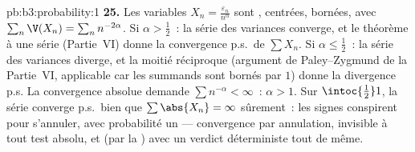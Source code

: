 \begin{solution}{pb:b3:probability:1}
\textbf{25.} Les variables $X_n = \frac{\varepsilon_n}
{n^\alpha}$ sont , centrées, bornées, avec
$\sum_n\V(X_n) = \sum_nn^{-2\alpha}$. Si $\alpha >
\frac12$~: la série des variances converge, et le théorème
à une série (Partie~VI) donne la convergence p.s.\ de
$\sum X_n$. Si $\alpha \leq \frac12$~: la série des
variances diverge, et la moitié réciproque (argument de
Paley--Zygmund de la Partie~VI, applicable car les summands
sont bornés par $1$) donne la divergence p.s. La
convergence absolue demande $\sum n^{-\alpha} < \infty$~:
$\alpha > 1$. Sur $\intoc{\frac12}1$, la série converge
p.s.\ bien que $\sum\abs{X_n} = \infty$ sûrement~: les
signes conspirent pour s'annuler, avec probabilité un ---
convergence par annulation, invisible à tout test
absolu, et (par la ) avec un verdict
déterministe tout de même.
\end{solution}
